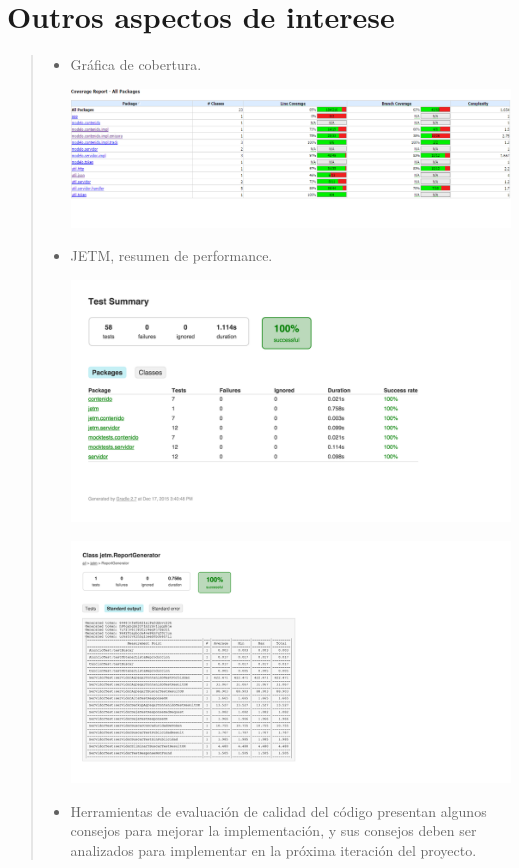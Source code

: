 \documentclass[DIV=calc,paper=a4,fontsize=11pt,onecolumn]{scrartcl}	 %
\newcommand{\hint}[1]{\begin{quote}\itshape #1 \end{quote}}
\begin{document}
\section{Outros aspectos de interese}

\hint{
	\begin{itemize}
		\item Gráfica de cobertura.
		
		\begin{center}
		   \includegraphics[scale=0.5,center]{images/cobertura.png}
	    \end{center}
	
		\item JETM, resumen de performance.
		
		\begin{center}
			\includegraphics[scale=0.7,center]{images/jetm_summary.png}
		\end{center}		
		
		\begin{center}
			\includegraphics[scale=0.7,center]{images/jetm_details.png}
		\end{center}				
		
		\item Herramientas de evaluación de calidad del código presentan algunos consejos para mejorar la implementación, y sus consejos deben ser analizados para implementar en la próxima iteración del proyecto. 
	\end{itemize}}
\end{document}
